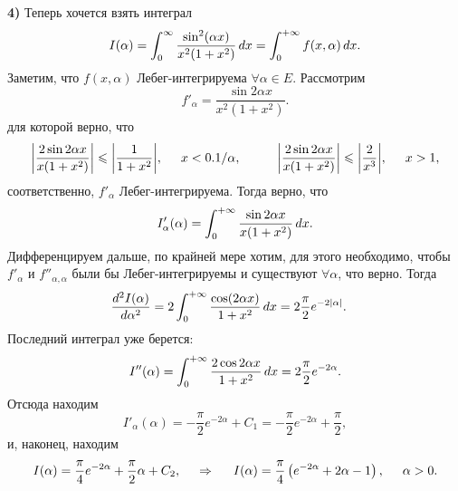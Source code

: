 \noindent
\textbf{4)} Теперь хочется взять интеграл
\begin{equation*}
    I(\alpha) = \int_0^\infty \frac{\sin^2 (\alpha x)}{x^2 (1+x^2)} \, d x = \int_0^{+\infty} f(x, \alpha) \, d x.
\end{equation*}
Заметим, что $f(x, \alpha)$ Лебег-интегрируема $\forall \alpha \in E$. Рассмотрим
\begin{equation*}
    f'_\alpha = \frac{\sin 2\alpha x}{x^2 (1 + x^2)}.
\end{equation*}
для которой верно, что
\begin{equation*}
    \bigg|
        \frac{2 \sin 2 \alpha x}{x (1 + x^2)}
    \bigg| \leq \bigg|
        \frac{1}{1 + x^2}
    \bigg|, \hspace{5 mm} x < 0.1/\alpha,
    \hspace{10 mm}
    \bigg|
        \frac{2 \sin 2 \alpha x}{x (1 + x^2)}
    \bigg| \leq \bigg|
        \frac{2}{x^3}
    \bigg|, \hspace{5 mm} x > 1,
\end{equation*}
соответственно, $f'_\alpha$ Лебег-интегрируема. Тогда верно, что
\begin{equation*}
    I'_\alpha (\alpha) = \int_0^{+\infty}  \frac{\sin 2 \alpha x}{x (1 + x^2)} \, d x.
\end{equation*}
Дифференцируем дальше, по крайней мере хотим, для этого необходимо, чтобы $f'_\alpha$ и $f''_{\alpha, \alpha}$ были бы Лебег-интегрируемы и существуют $\forall \alpha$, что верно. Тогда
\begin{align*}
    \frac{d^2 I(\alpha)}{d \alpha^2} &= 2 \int_{0}^{+\infty} 
    \frac{\cos(2 \alpha x)}{1+x^2} \, d x = 2 \frac{\pi}{2} e^{-2 |\alpha|}.
\end{align*}
Последний интеграл уже берется:
\begin{equation*}
    I''(\alpha) = \int_0^{+\infty}  \frac{2 \cos 2 \alpha x}{1 + x^2} \, d x = 2 \frac{\pi}{2} e^{-2 \alpha}.
\end{equation*}
Отсюда находим
\begin{equation*}
    I'_\alpha (\alpha) = - \frac{\pi}{2} e^{- 2\alpha} + C_1 = - \frac{\pi}{2} e^{-2\alpha} + \frac{\pi}{2},
\end{equation*}
и, наконец, находим
\begin{equation*}
    I(\alpha) = \frac{\pi}{4} e^{-2\alpha} + \frac{\pi}{2} \alpha + C_2,
    \hspace{0.5cm} \Rightarrow \hspace{0.5cm}
    I(\alpha) = \frac{\pi}{4}\left(
        e^{-2\alpha} + 2 \alpha  -1
    \right), \hspace{5 mm} \alpha > 0.
\end{equation*}



